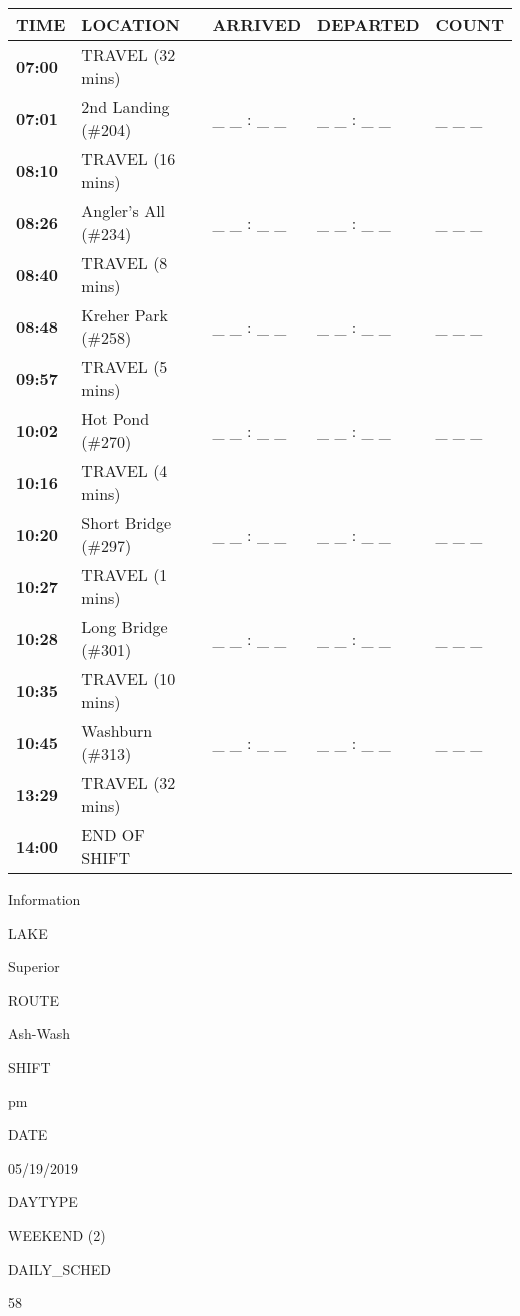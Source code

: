\documentclass[]{article}
\begin{document}
\begin{tabular}{>{\bfseries}lllll}
\toprule
\textbf{TIME} & \textbf{LOCATION} & \textbf{ARRIVED} & \textbf{DEPARTED} & \textbf{COUNT}\\
\midrule
07:00 & TRAVEL (32 mins) &  &  & \\
07:01 & 2nd Landing (\#204) & \_ \_ : \_ \_ & \_ \_ : \_ \_ & \_ \_ \_\\
08:10 & TRAVEL (16 mins) &  &  & \\
08:26 & Angler's All (\#234) & \_ \_ : \_ \_ & \_ \_ : \_ \_ & \_ \_ \_\\
08:40 & TRAVEL (8 mins) &  &  & \\
08:48 & Kreher Park (\#258) & \_ \_ : \_ \_ & \_ \_ : \_ \_ & \_ \_ \_\\
09:57 & TRAVEL (5 mins) &  &  & \\
10:02 & Hot Pond (\#270) & \_ \_ : \_ \_ & \_ \_ : \_ \_ & \_ \_ \_\\
10:16 & TRAVEL (4 mins) &  &  & \\
10:20 & Short Bridge (\#297) & \_ \_ : \_ \_ & \_ \_ : \_ \_ & \_ \_ \_\\
10:27 & TRAVEL (1 mins) &  &  & \\
10:28 & Long Bridge (\#301) & \_ \_ : \_ \_ & \_ \_ : \_ \_ & \_ \_ \_\\
10:35 & TRAVEL (10 mins) &  &  & \\
10:45 & Washburn (\#313) & \_ \_ : \_ \_ & \_ \_ : \_ \_ & \_ \_ \_\\
13:29 & TRAVEL (32 mins) &  &  & \\
14:00 & END OF SHIFT &  &  & \\
\bottomrule
\end{tabular}\newpage

Information

LAKE

Superior

ROUTE

Ash-Wash

SHIFT

pm

DATE

05/19/2019

DAYTYPE

WEEKEND (2)

DAILY\_SCHED

58

\vspace{24pt}
\end{document}
